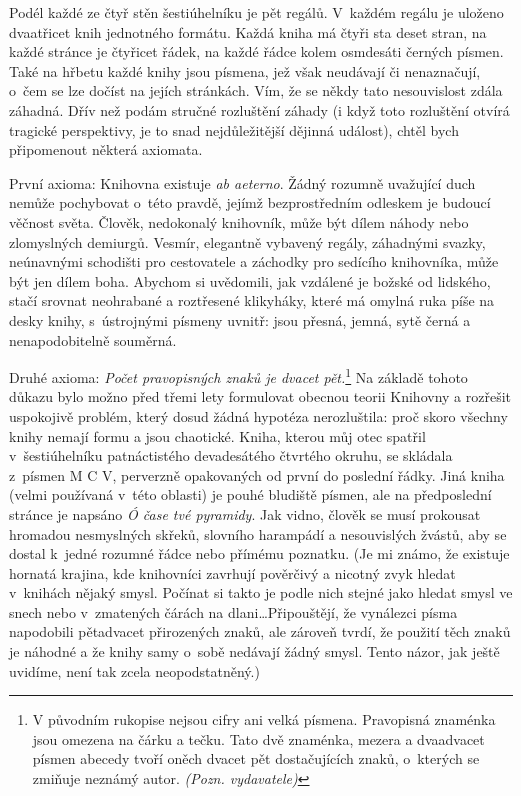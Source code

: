 \documentclass[11pt]{article}
\begin{document}
Podél každé ze čtyř stěn šestiúhelníku je pět regálů. V~každém regálu je uloženo dvaatřicet knih jednotného formátu. Každá kniha má čtyři sta deset stran, na každé stránce je čtyřicet řádek, na každé řádce kolem osmdesáti černých písmen. Také na hřbetu každé knihy jsou písmena, jež však neudávají či nenaznačují, o~čem se lze dočíst na jejích stránkách. Vím, že se někdy tato nesouvislost zdála záhadná. Dřív než podám stručné rozluštění záhady (i když toto rozluštění otvírá tragické perspektivy, je to snad nejdůležitější dějinná událost), chtěl bych připomenout některá axiomata.

První axioma: Knihovna existuje \textit{ab aeterno}. Žádný rozumně uvažující duch nemůže pochybovat o~této pravdě, jejímž bezprostředním odleskem je budoucí věčnost světa. Člověk, nedokonalý knihovník, může být dílem náhody nebo zlomyslných demiurgů. Vesmír, elegantně vybavený regály, záhadnými svazky, neúnavnými schodišti pro cestovatele a záchodky pro sedícího knihovníka, může být jen dílem boha. Abychom si uvědomili, jak vzdálené je božské od lidského, stačí srovnat neohrabané a roztřesené klikyháky, které má omylná ruka píše na desky knihy, s~ústrojnými písmeny uvnitř: jsou přesná, jemná, sytě černá a nenapodobitelně souměrná.

Druhé axioma: \textit{Počet pravopisných znaků je dvacet pět.}\footnote{V původním rukopise nejsou cifry ani velká písmena. Pravopisná znaménka jsou omezena na čárku a tečku. Tato dvě znaménka, mezera a dvaadvacet písmen abecedy tvoří oněch dvacet pět dostačujících znaků, o~kterých se zmiňuje neznámý autor. \textit{(Pozn. vydavatele)}} Na základě tohoto důkazu bylo možno před třemi lety formulovat obecnou teorii Knihovny a rozřešit uspokojivě problém, který dosud žádná hypotéza nerozluštila: proč skoro všechny knihy nemají formu a jsou chaotické. Kniha, kterou můj otec spatřil v~šestiúhelníku patnáctistého devadesátého čtvrtého okruhu, se skládala z~písmen M C V, perverzně opakovaných od první do poslední řádky. Jiná kniha (velmi používaná v~této oblasti) je pouhé bludiště písmen, ale na předposlední stránce je napsáno \textit{Ó čase tvé pyramidy}. Jak vidno, člověk se musí prokousat hromadou nesmyslných skřeků, slovního harampádí a nesouvislých žvástů, aby se dostal k~jedné rozumné řádce nebo přímému poznatku. (Je mi známo, že existuje hornatá krajina, kde knihovníci zavrhují pověrčivý a nicotný zvyk hledat v~knihách nějaký smysl. Počínat si takto je podle nich stejné jako hledat smysl ve snech nebo v~zmatených čárách na dlani\dots Připouštějí, že vynálezci písma napodobili pětadvacet přirozených znaků, ale zároveň tvrdí, že použití těch znaků je náhodné a že knihy samy o~sobě nedávají žádný smysl. Tento názor, jak ještě uvidíme, není tak zcela neopodstatněný.)
\end{document}
